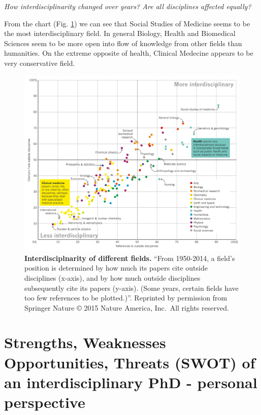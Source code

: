 \documentclass[12pt,]{book}
\theoremstyle{definition}
\theoremstyle{definition}
\theoremstyle{definition}
\theoremstyle{remark}
\begin{document}
\emph{How interdisciplinarity changed over years? Are all disciplines
affected equally?}

From the chart (Fig. \ref{fig:interdisciplinary}) we can see that Social
Studies of Medicine seems to be the most interdisciplinary field. In
general Biology, Health and Biomedical Sciences seem to be more open
into flow of knowledge from other fields than humanities. On the extreme
opposite of health, Clinical Medecine appears to be very conservative
field.

\begin{figure}

{\centering \includegraphics[width=0.9\linewidth]{figures-ext/interdisciplinary} 

}

\caption[Interdisciplnarity of different fields.]{\textbf{Interdisciplnarity of different
fields.} ``From 1950-2014, a field's position is determined by how much
its papers cite outside disciplines (x-axis), and by how much outside
disciplines subsequently cite its papers (y-axis). (Some years, certain
fields have too few references to be plotted.)''. Reprinted by
permission from Springer Nature \citep{VanNoorden2015} © 2015 Nature
America, Inc.~All rights reserved.}\label{fig:interdisciplinary}
\end{figure}









\hypertarget{strengths-weaknesses-opportunities-threats-swot-of-an-interdisciplinary-phd---personal-perspective}{%
\section*{Strengths, Weaknesses Opportunities, Threats (SWOT) of an
interdisciplinary PhD - personal
perspective}\label{strengths-weaknesses-opportunities-threats-swot-of-an-interdisciplinary-phd---personal-perspective}}
\end{document}
